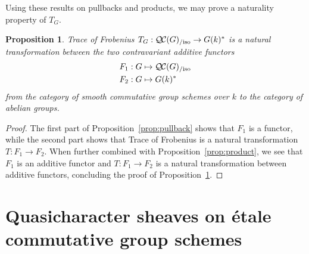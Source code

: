 \documentclass{amsart}
\theoremstyle{plain}
\newtheorem{proposition}[theorem]{Proposition}
\theoremstyle{definition}
\theoremstyle{remark}
\newcommand{\bFq}{\bar{k}}
\newcommand{\Fq}{k}
\DeclareMathOperator{\Gal}{Gal}
\newcommand{\TrFrob}[1]{T_{#1}}
\newcommand{\QC}{{\mathcal{Q\hskip-0.8pt C}}}
\newcommand{\lQC}{{\QC_\text{flb}}}
\newcommand{\lQCiso}[1]{\lQC(#1)_{/\text{iso}}}
\newcommand{\QCiso}[1]{\QC(#1)_{/\text{iso}}}
\begin{document}
Using these results on pullbacks and products, we may prove a naturality property of $\TrFrob{G}$.

\begin{proposition}\label{prop:functorialG}
Trace of Frobenius $\TrFrob{G} : \QCiso{G} \to G(\Fq)^*$ is a natural transformation
between the two contravariant additive functors
\begin{align*}
F_1 : G &\mapsto \QCiso{G} \\
F_2 : G &\mapsto G(\Fq)^*
\end{align*}
from the category of smooth commutative group schemes over $\Fq$ to the category of abelian groups.
\end{proposition}

\begin{proof}
The first part of Proposition~\ref{prop:pullback} shows that $F_1$ is a functor,
while the second part shows that Trace of Frobenius is a natural transformation
$T: F_1 \to F_2$. When further combined with Proposition~\ref{prop:product},
we see that $F_1$ is an additive functor and $T: F_1 \to F_2$ is a natural
transformation between additive functors,
concluding the proof of Proposition~\ref{prop:functorialG}.
\end{proof}


\section{Quasicharacter sheaves on \'etale commutative group schemes} \label{sec:etale}


\end{document}
